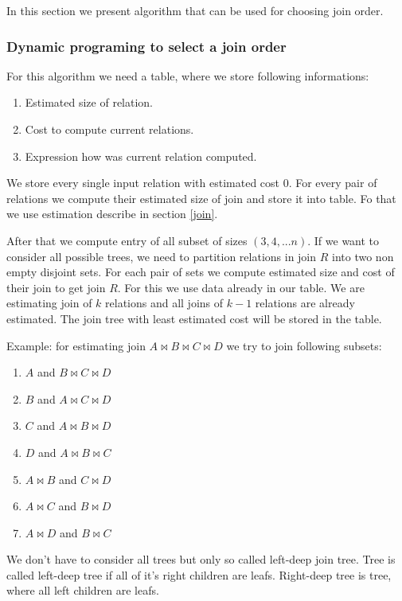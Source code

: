 In this section we present algorithm that can be used for choosing join order.
 
\subsubsection{Dynamic programing to select a join order}
\label{dymanicalgorithm}
For this algorithm we need a table, where we store following informations:
 
\begin{enumerate}
\item Estimated size of relation.
\item Cost to compute current relations.
\item Expression how was current relation computed.
\end{enumerate}

We store every single input relation with estimated cost 0. For every pair of relations we compute their estimated size of join and store it into table. Fo that we use estimation describe in section \ref{join}.  

After that we compute entry of all subset of sizes $(3,4,...n)$.
If we want to consider all possible trees, we need to partition relations in join $R$ into two non empty disjoint sets. For each pair of sets we compute estimated size and cost of their join to get join $R$. For this we use data already in our table. We are estimating join of $k$ relations and all joins of $k-1$ relations are already estimated. The join tree with least estimated cost will be stored in the table.

Example: for estimating join $A\Join B\Join C\Join D$ we try to join following subsets:
\begin{enumerate}
\item $A$ and $B\Join C\Join D$
\item $B$ and $A\Join C\Join D$
\item $C$ and $A\Join B\Join D$
\item $D$ and $A\Join B\Join C$
\item $A\Join B$ and $C\Join D$
\item $A\Join C$ and $B\Join D$
\item $A\Join D$ and $B\Join C$

\end{enumerate}

We don't have to consider all trees but only so called left-deep join tree. Tree is called left-deep tree if all of it's right children are leafs. Right-deep tree is tree, where all left children are leafs.
 
